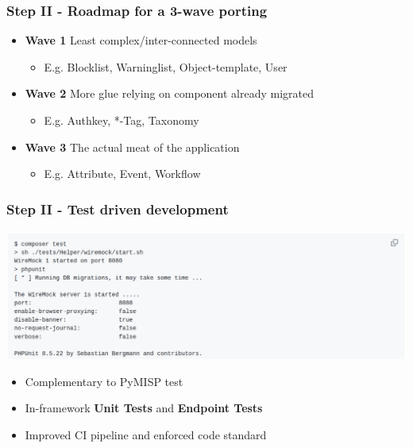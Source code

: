 \begin{frame}
    \frametitle{Step II - Roadmap for a 3-wave porting}
    \begin{itemize}
        \setlength\itemsep{1em}
        \item[] \textbf{\color{main}Wave 1} Least complex/inter-connected models
        \begin{itemize}
            \item E.g. Blocklist, Warninglist, Object-template, User
        \end{itemize}
        \item[] \textbf{\color{main}Wave 2} More glue relying on component already migrated
        \begin{itemize}
            \item E.g. Authkey, *-Tag, Taxonomy
        \end{itemize}
        \item[] \textbf{\color{main}Wave 3} The actual meat of the application
        \begin{itemize}
            \item E.g. Attribute, Event, Workflow
        \end{itemize}
    \end{itemize}
\end{frame}

\begin{frame}
    \frametitle{Step II - Test driven development}
    \begin{center}
        \includegraphics[width=1.0\linewidth]{pictures/phpunit.png}
    \end{center}
    \begin{itemize}
        \item Complementary to PyMISP test
        \item In-framework \textbf{Unit Tests} and \textbf{Endpoint Tests}
        \item Improved CI pipeline and enforced code standard
    \end{itemize}
\end{frame}


